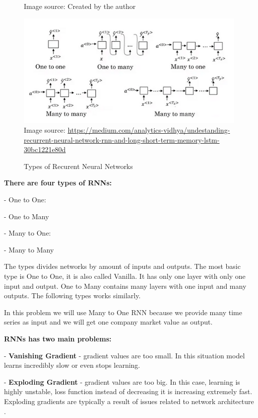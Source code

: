 \documentclass{article}
\begin{document}
\begin{flushleft}
\begin{justify}
\begin{figure}[H]
\small Image source: Created by the author 
\end{figure}




\begin{figure}[H]
\centering 
\caption{Types of Recurent Neural Networks}
\includegraphics{imgs/rnn_types.PNG}
\small Image source: \url{https://medium.com/analytics-vidhya/undestanding-recurrent-neural-network-rnn-and-long-short-term-memory-lstm-30bc1221e80d}
\end{figure}

\textbf{There are four types of RNNs:}

- One to One:

- One to Many

- Many to One:

- Many to Many

\vspace{1em}

The types divides networks by amount of inputs and outputs. The most basic type is One to One, it is also called Vanilla. It has only one layer with only one input and output. One to Many contains many layers with one input and many outputs. The following types works similarly.

In this problem we will use Many to One RNN because we provide many time series as input and we will get one company market value as output.

\vspace{1em}

\textbf{RNNs has two main problems:}

- \textbf{Vanishing Gradient} - gradient values are too small. In this situation model learns incredibly slow or even stops learning.

-\textbf{ Exploding Gradient} - gradient values are too big. In this case, learning is highly unstable, loss function instead of decreasing it is increasing extremely fast. Exploding gradients are typically a result of issues related to network architecture .


\end{justify}
\end{flushleft}
\end{document}
